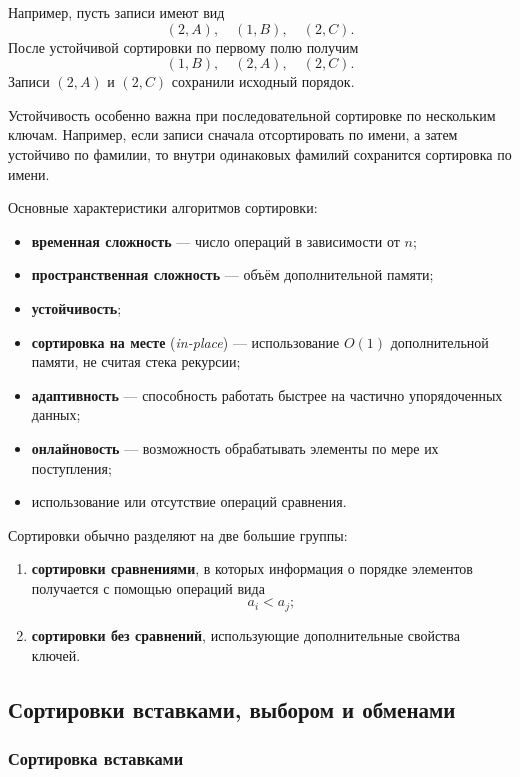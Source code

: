 Например, пусть записи имеют вид
\[
(2,A),\quad (1,B),\quad (2,C).
\]
После устойчивой сортировки по первому полю получим
\[
(1,B),\quad (2,A),\quad (2,C).
\]
Записи $(2,A)$ и $(2,C)$ сохранили исходный порядок.

Устойчивость особенно важна при последовательной сортировке по нескольким
ключам. Например, если записи сначала отсортировать по имени, а затем
устойчиво по фамилии, то внутри одинаковых фамилий сохранится сортировка
по имени.

Основные характеристики алгоритмов сортировки:

\begin{itemize}
	\item \textbf{временная сложность} --- число операций в зависимости от $n$;
	\item \textbf{пространственная сложность} --- объём дополнительной памяти;
	\item \textbf{устойчивость};
	\item \textbf{сортировка на месте} (\textit{in-place}) --- использование
	$O(1)$ дополнительной памяти, не считая стека рекурсии;
	\item \textbf{адаптивность} --- способность работать быстрее на частично
	упорядоченных данных;
	\item \textbf{онлайновость} --- возможность обрабатывать элементы по мере
	их поступления;
	\item использование или отсутствие операций сравнения.
\end{itemize}

Сортировки обычно разделяют на две большие группы:

\begin{enumerate}
	\item \textbf{сортировки сравнениями}, в которых информация о порядке
	элементов получается с помощью операций вида
	\[
	a_i < a_j;
	\]
	\item \textbf{сортировки без сравнений}, использующие дополнительные
	свойства ключей.
\end{enumerate}


\subsection{Сортировки вставками, выбором и обменами}

\subsubsection*{Сортировка вставками}

